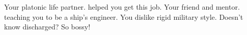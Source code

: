 \documentclass[char]{TMFHope}
\begin{document}
\begin{contacts}
	\contact{\cNav{}} Your platonic life partner. \cNav{\They} helped you get this job.
	\contact{\cEng{}} Your friend and mentor. \cEng{\They} \cEng{\are} teaching you to be a ship's engineer.
	\contact{\cCap{}} You dislike \cCap{\their} rigid military style. Doesn't \cCap{} know \cCap{\they} \cCap{\were} discharged? So bossy!
\end{contacts}
\end{document}
